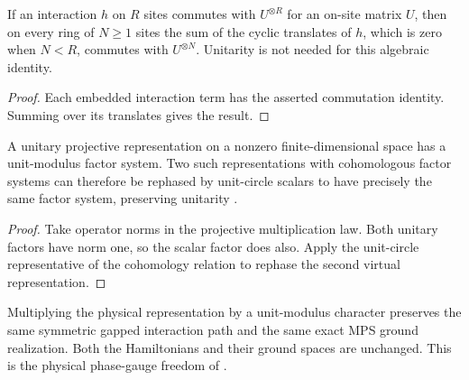 \begin{lemma}
    \label{thm:spt_interaction_hamiltonian_symmetry}
    \leanok
    If an interaction $h$ on $R$ sites commutes with $U^{\otimes R}$
    for an on-site matrix $U$, then on every ring of $N\geq1$ sites the
    sum of the cyclic translates of $h$, which is zero when $N<R$,
    commutes with $U^{\otimes N}$. Unitarity is not needed for this
    algebraic identity.
\end{lemma}

\begin{proof}\leanok
    Each embedded interaction term has the asserted commutation
    identity. Summing over its translates gives the result.
\end{proof}

\begin{lemma}
    \label{thm:spt_unitary_factor_alignment}
    \leanok
    A unitary projective representation on a nonzero finite-dimensional
    space has a unit-modulus factor system. Two such representations with
    cohomologous factor systems can therefore be rephased by unit-circle
    scalars to have precisely the same factor system, preserving unitarity
    \cite[Section~II.F.2]{Schuch2011Phases}.
\end{lemma}

\begin{proof}\leanok
    Take operator norms in the projective multiplication law. Both unitary
    factors have norm one, so the scalar factor does also. Apply the
    unit-circle representative of the cohomology relation to rephase the
    second virtual representation.
\end{proof}

\begin{lemma}
    \label{thm:spt_character_gapped_path}
    \leanok
    Multiplying the physical representation by a unit-modulus character
    preserves the same symmetric gapped interaction path and the same
    exact MPS ground realization. Both the Hamiltonians and their ground
    spaces are unchanged. This is the physical phase-gauge freedom of
    \cite[Section~II.C.2 and Appendix~B]{Schuch2011Phases}.
\end{lemma}

